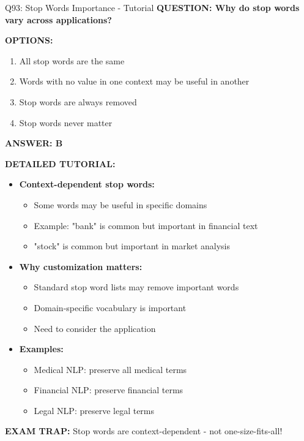 \documentclass[8pt]{beamer}
\begin{document}
	\begin{frame}{Q93: Stop Words Importance - Tutorial}
		\fontsize{6.5}{7.5}\selectfont
		\textbf{QUESTION: Why do stop words vary across applications?}
		
		\vspace{0.1cm}
		\textbf{OPTIONS:}
		\begin{enumerate}
			\item All stop words are the same
			\item Words with no value in one context may be useful in another
			\item Stop words are always removed
			\item Stop words never matter
		\end{enumerate}
		
		\vspace{0.1cm}
		\textcolor{myblue}{\textbf{ANSWER: B}}
		
		\vspace{0.1cm}
		\textbf{DETAILED TUTORIAL:}
		\begin{itemize}
			\item \textbf{Context-dependent stop words:}
			\begin{itemize}
				\item Some words may be useful in specific domains
				\item Example: "bank" is common but important in financial text
				\item "stock" is common but important in market analysis
			\end{itemize}
			\item \textbf{Why customization matters:}
			\begin{itemize}
				\item Standard stop word lists may remove important words
				\item Domain-specific vocabulary is important
				\item Need to consider the application
			\end{itemize}
			\item \textbf{Examples:}
			\begin{itemize}
				\item Medical NLP: preserve all medical terms
				\item Financial NLP: preserve financial terms
				\item Legal NLP: preserve legal terms
			\end{itemize}
		\end{itemize}
		
		\textcolor{myred}{\textbf{EXAM TRAP:}} Stop words are \textcolor{myblue}{context-dependent} - not one-size-fits-all!
	\end{frame}
	
\end{document}
